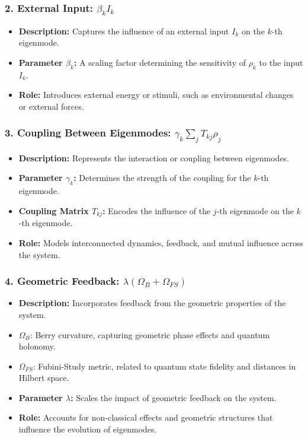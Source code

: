 \documentclass{article}
\theoremstyle{plain}
\begin{document}
\subsubsection{2. External Input: \(\beta_k I_k\)}
\begin{itemize}
    \item \textbf{Description:} Captures the influence of an external input \(I_k\) on the \(k\)-th eigenmode.
    \item \textbf{Parameter \(\beta_k\):} A scaling factor determining the sensitivity of \(\rho_k\) to the input \(I_k\).
    \item \textbf{Role:} Introduces external energy or stimuli, such as environmental changes or external forces.
\end{itemize}

\subsubsection{3. Coupling Between Eigenmodes: \(\gamma_k \sum_j T_{kj} \rho_j\)}
\begin{itemize}
    \item \textbf{Description:} Represents the interaction or coupling between eigenmodes.
    \item \textbf{Parameter \(\gamma_k\):} Determines the strength of the coupling for the \(k\)-th eigenmode.
    \item \textbf{Coupling Matrix \(T_{kj}\):} Encodes the influence of the \(j\)-th eigenmode on the \(k\)-th eigenmode.
    \item \textbf{Role:} Models interconnected dynamics, feedback, and mutual influence across the system.
\end{itemize}

\subsubsection{4. Geometric Feedback: \(\lambda (\Omega_B + \Omega_{FS})\)}
\begin{itemize}
    \item \textbf{Description:} Incorporates feedback from the geometric properties of the system.
    \item \(\Omega_B\): Berry curvature, capturing geometric phase effects and quantum holonomy.
    \item \(\Omega_{FS}\): Fubini-Study metric, related to quantum state fidelity and distances in Hilbert space.
    \item \textbf{Parameter \(\lambda\):} Scales the impact of geometric feedback on the system.
    \item \textbf{Role:} Accounts for non-classical effects and geometric structures that influence the evolution of eigenmodes.
\end{itemize}
\end{document}
